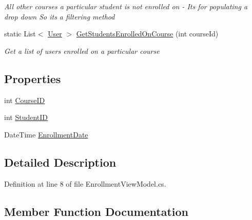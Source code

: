 \begin{DoxyCompactItemize}
\begin{DoxyCompactList}\small\item\em All other courses a particular student is not enrolled on -\/ It\textquotesingle{}s for populating a drop down So it\textquotesingle{}s a \textquotesingle{}filtering\textquotesingle{} method \end{DoxyCompactList}\item 
static List$<$ \hyperlink{class_uni_enrollment___m_v_c_1_1_models_1_1_user}{User} $>$ \hyperlink{class_uni_enrollment___m_v_c_1_1_models_1_1_enrollment_view_model_a9b1ff396627b19e9d8b3b357ed36e787}{Get\+Students\+Enrolled\+On\+Course} (int course\+Id)
\begin{DoxyCompactList}\small\item\em Get a list of users enrolled on a particular course \end{DoxyCompactList}\end{DoxyCompactItemize}
\subsection*{Properties}
\begin{DoxyCompactItemize}
\item 
int \hyperlink{class_uni_enrollment___m_v_c_1_1_models_1_1_enrollment_view_model_a4c171e275e120403f4fc627757eb2d17}{Course\+ID}
\item 
int \hyperlink{class_uni_enrollment___m_v_c_1_1_models_1_1_enrollment_view_model_a37ef31b609762bd1d4db2944dbbb42a0}{Student\+ID}
\item 
Date\+Time \hyperlink{class_uni_enrollment___m_v_c_1_1_models_1_1_enrollment_view_model_ac4df04e11eccbb18ec3e8304ac7fbc0e}{Enrollment\+Date}
\end{DoxyCompactItemize}


\subsection{Detailed Description}


Definition at line 8 of file Enrollment\+View\+Model.\+cs.



\subsection{Member Function Documentation}
